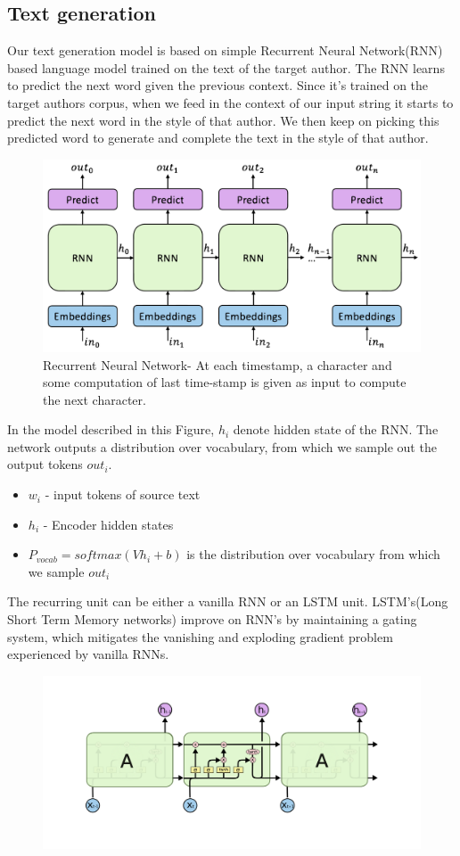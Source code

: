 \documentclass{article} %
\begin{document}
\subsection{Text generation}
Our text generation model is based on simple Recurrent Neural Network(RNN) based language model trained on the text of the target author. The RNN learns to predict the next word given the previous context. Since it's trained on the target authors corpus, when we feed in the context of our input string it starts to predict the next word in the style of that author. We then keep on picking this predicted word to generate and complete the text in the style of that author.\\
\begin{figure}[ht!]
    \centering
    \includegraphics[width=0.8\linewidth]{1.pdf}
    \caption{Recurrent Neural Network- At each timestamp, a character and some computation of last time-stamp is given as input to compute the next character.}
\end{figure}
In the model described in this Figure, $h_i$ denote hidden state of the RNN. The network outputs a distribution over vocabulary, from which we sample out the output tokens $out_i$.
\begin{itemize}
        \item $w_i$ - input tokens of source text    
        \item $h_i$ - Encoder hidden states
        \item $P_{vocab} = softmax(Vh_i + b)$ is the distribution over vocabulary from which we sample $out_i$
        \label{fig:lstm}
\end{itemize}
The recurring unit can be either a vanilla RNN or an LSTM unit. LSTM's(Long Short Term Memory networks) improve on RNN's by maintaining a gating system, which mitigates the vanishing and exploding gradient problem experienced by vanilla RNNs.
  \begin{figure}[h]
  \centering
  \includegraphics[width=0.8\linewidth]{5.pdf}
  \end{figure}
\end{document}
